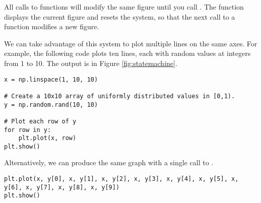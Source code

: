 All calls to  functions will modify the same figure until you call . 
The function  displays the current figure and resets the system, so that the next call to a  function modifies a new figure. 

We can take advantage of this system to plot multiple lines on the same axes.
For example, the following code plots ten lines, each with random values at integers from 1 to 10. 
The output is in Figure \ref{fig:statemachine}.
\begin{lstlisting}
x = np.linspace(1, 10, 10)

# Create a 10x10 array of uniformly distributed values in [0,1).
y = np.random.rand(10, 10)

# Plot each row of y
for row in y:
    plt.plot(x, row)
plt.show()
\end{lstlisting}

Alternatively, we can produce the same graph with a single call to .
\begin{lstlisting}
plt.plot(x, y[0], x, y[1], x, y[2], x, y[3], x, y[4], x, y[5], x, y[6], x, y[7], x, y[8], x, y[9])
plt.show()
\end{lstlisting}



\begin{comment}
\begin{problem} Plot the function $\sin(x)$ from $0$ to $2\pi$ with a red dashed line.
Then plot the function $\cos(x)$ on the same domain with a blue dotted line.
Implement both with a single call to the \li{plot()} function.
Information on how to do this can be found in Appendix \ref{mpltables}.
\end{problem}
\end{comment}

